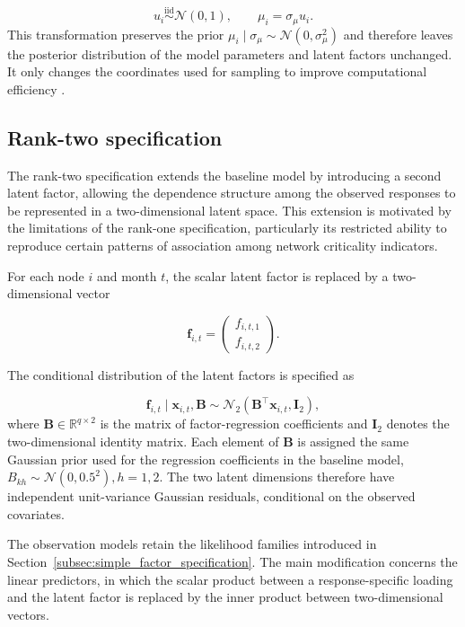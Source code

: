 \documentclass[pdftex,12pt,openright,a4paper,oneside]{book}
\begin{document}
\begin{equation}
u_i\overset{\mathrm{iid}}{\sim}\mathcal{N}(0,1),
\qquad
\mu_i=\sigma_\mu u_i.
\label{eq:node_effect_noncentered}
\end{equation}
This transformation preserves the prior
$\mu_i\mid\sigma_\mu\sim\mathcal{N}(0,\sigma_\mu^2)$
and therefore leaves the posterior distribution
of the model parameters and latent factors unchanged.
It only changes the coordinates used for sampling
to improve computational efficiency \citep{papaspiliopoulos2007general}.

\subsection{Rank-two specification}
\label{subsec_rank_two_model}
The rank-two specification extends the baseline model by introducing a second latent factor, allowing the dependence structure among the observed responses to be represented in a two-dimensional latent space. This extension is motivated by the limitations of the rank-one specification, particularly its restricted ability to reproduce certain patterns of association among network criticality indicators.

For each node \(i\) and month \(t\), the scalar latent factor is replaced by a two-dimensional vector

\[
\mathbf f_{i,t}
=
\begin{pmatrix}
f_{i,t,1}\\
f_{i,t,2}
\end{pmatrix}.
\]

The conditional distribution of the latent factors is specified as

\begin{equation}
\mathbf f_{i,t}\mid\mathbf x_{i,t},\mathbf B
\sim
\mathcal N_2
\left(
\mathbf B^\top\mathbf x_{i,t},
\mathbf I_2
\right),
\end{equation}
where \(\mathbf B\in\mathbb R^{q\times 2}\) is the matrix of factor-regression coefficients and \(\mathbf I_2\) denotes the two-dimensional identity matrix. Each element of \(\mathbf B\) is assigned the same Gaussian prior used for the regression coefficients in the baseline model,
$
B_{kh}\sim\mathcal N(0,0.5^2), h=1,2.
$
The two latent dimensions therefore have independent unit-variance Gaussian residuals, conditional on the observed covariates.

The observation models retain the likelihood families introduced in Section~\ref{subsec:simple_factor_specification}. 
The main modification concerns the linear predictors, in which the scalar product between a response-specific loading 
and the latent factor is replaced by the inner product between two-dimensional vectors.
\end{document}
